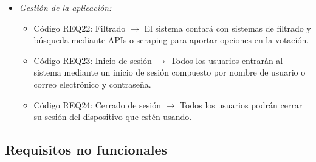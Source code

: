 \begin{itemize}
\begin{itemize}
          \item Código REQ20: Ganador de la votación $\rightarrow$ Una vez acabado el tiempo destinado a la votación o habiendo votado todos los miembros, el sistema calculará automáticamente el ganador según los votos y el método de votación elegido.
          \item Código REQ21: Mostrar los resultados $\rightarrow$ Al finalizar una votación los miembros podrán visualizar los resultados.
        \end{itemize}    
    \item \textit{\uline{Gestión de la aplicación:}}
        \begin{itemize}
            \item Código REQ22: Filtrado $\rightarrow$ El sistema contará con sistemas de filtrado y búsqueda mediante APIs o scraping para aportar opciones en la votación.
            \item Código REQ23: Inicio de sesión $\rightarrow$ Todos los usuarios entrarán al sistema mediante un inicio de sesión compuesto por nombre de usuario o correo electrónico y contraseña.
            \item Código REQ24: Cerrado de sesión $\rightarrow$ Todos los usuarios podrán cerrar su sesión del dispositivo que estén usando.
        \end{itemize}
\end{itemize}

\subsection{Requisitos no funcionales}

